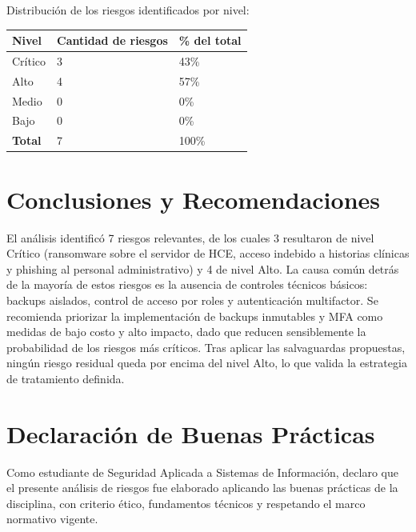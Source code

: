 \documentclass[11pt,a4paper]{article}
\begin{document}
Distribución de los riesgos identificados por nivel:

\begin{center}
\renewcommand{\arraystretch}{1.4}
\begin{tabularx}{0.85\textwidth}{@{} p{4cm} p{3.5cm} X @{}}
\toprule
\textbf{Nivel} & \textbf{Cantidad de riesgos} & \textbf{\% del total} \\
\midrule
\cellcolor{nivelcritico} Crítico & 3 & 43\% \\
\cellcolor{nivelalto} Alto & 4 & 57\% \\
\cellcolor{nivelmedio} Medio & 0 & 0\% \\
\cellcolor{nivelbajo} Bajo & 0 & 0\% \\
\midrule
\textbf{Total} & 7 & 100\% \\
\bottomrule
\end{tabularx}
\end{center}

\section{Conclusiones y Recomendaciones}

\begin{campolibre}[4cm]
El análisis identificó 7 riesgos relevantes, de los cuales 3 resultaron de nivel Crítico
(ransomware sobre el servidor de HCE, acceso indebido a historias clínicas y phishing al
personal administrativo) y 4 de nivel Alto. La causa común detrás de la mayoría de estos
riesgos es la ausencia de controles técnicos básicos: backups aislados, control de acceso por
roles y autenticación multifactor. Se recomienda priorizar la implementación de backups
inmutables y MFA como medidas de bajo costo y alto impacto, dado que reducen sensiblemente
la probabilidad de los riesgos más críticos. Tras aplicar las salvaguardas propuestas, ningún
riesgo residual queda por encima del nivel Alto, lo que valida la estrategia de tratamiento
definida.
\end{campolibre}

\section{Declaración de Buenas Prácticas}

\begin{informacion}
Como estudiante de Seguridad Aplicada a Sistemas de Información, declaro que el presente análisis de riesgos fue elaborado aplicando las buenas prácticas de la disciplina, con criterio ético, fundamentos técnicos y respetando el marco normativo vigente.
\end{informacion}
\end{document}
